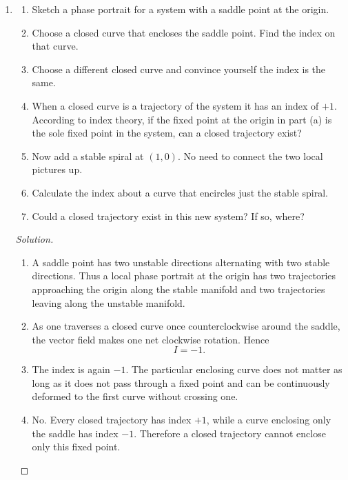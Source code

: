 \documentclass[12pt]{amsart}
\theoremstyle{plain}
\theoremstyle{definition}
\theoremstyle{definition}
\theoremstyle{plain}
\newenvironment{solution}
{\begin{proof}[Solution]}
{\end{proof}}
\begin{document}
    \begin{enumerate}[label=\arabic*.]
        \item
        \begin{enumerate}[label=(\alph*)]
            \item Sketch a phase portrait for a system with a saddle point at the origin.
            \item Choose a closed curve that encloses the saddle point. Find the index on that curve.
            \item Choose a different closed curve and convince yourself the index is the same.
            \item When a closed curve is a trajectory of the system it has an index of $+1$.
            According to index theory, if the fixed point at the origin in part (a) is the sole
            fixed point in the system, can a closed trajectory exist?
            \item Now add a stable spiral at $(1,0)$. No need to connect the two local pictures up.
            \item Calculate the index about a curve that encircles just the stable spiral.
            \item Could a closed trajectory exist in this new system? If so, where?
        \end{enumerate}

        \begin{solution}
            \begin{enumerate}[label=(\alph*)]
                \item A saddle point has two unstable directions alternating with two stable directions. Thus a local phase portrait at the origin has two trajectories approaching the origin along the stable manifold and two trajectories leaving along the unstable manifold.

                \item As one traverses a closed curve once counterclockwise around the saddle, the vector field makes one net clockwise rotation. Hence
                \[
                    I=-1.
                \]

                \item The index is again $-1$. The particular enclosing curve does not matter as long as it does not pass through a fixed point and can be continuously deformed to the first curve without crossing one.

                \item No. Every closed trajectory has index $+1$, while a curve enclosing only the saddle has index $-1$. Therefore a closed trajectory cannot enclose only this fixed point.


\end{enumerate}
\end{solution}
\end{enumerate}
\end{document}
